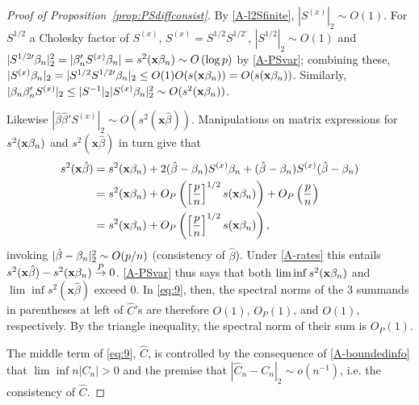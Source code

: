 \documentclass{article}
\theoremstyle{remark}
\begin{document}
\begin{proof}[Proof of Proposition~\ref{prop:PSdiffconsist}]
By \ref{A-l2Sfinite}, $|S^{(x)}|_{2} \sim O(1)$.  For $S^{1/2}$ a Cholesky factor of $S^{(x)}$, $S^{(x)} = S^{1/2}S^{1/2\prime}$, $|S^{1/2}|_{2} \sim O(1)$ and $|S^{{1/2}\prime}\beta_{n } |_{2}^{2} = |\beta_{n }'S^{(x)}\beta_{n }| = s^{2}(\mathbf{x}\beta_{n }) \sim O\left( \log p\right)
$ by \ref{A-PSvar}; combining these, $|S^{(x)}\betatrue|_{2} = |S^{1/2}S^{{1/2}\prime}\betatrue|_{2} \leq O(1) O(s(\mathbf{x}\betatrue)) = O(s(\mathbf{x}\betatrue))  %
$.  Similarly, $|\beta_{n }\beta_{n }'S^{(x)}|_{2}  \leq |S^{-1}|_{2} |S^{(x)}\beta_{n }|_{2}^{2} \sim O(s^{2}(\mathbf{x}\beta_{n }))$. 

Likewise $|\hat{\beta}\hat{\beta}'S^{(x)}|_{2} \sim O(s^{2}(\mathbf{x}\hat\beta))$.  Manipulations on matrix expressions for $s^2(\mathbf{x}\beta_{n })$ and $s^2(\mathbf{x}\hat\beta)$ in turn give that 
\begin{align}
  s^{2}(\mathbf{x}\hat\beta) &= s^{2}(\mathbf{x}\beta_{n }) + 2(\hat\beta - \beta_{n })S^{(x)}\beta_{n } + (\hat\beta - \beta_{n })S^{(x)}(\hat\beta -\beta_{n }) \nonumber \\
  &= s^{2}(\mathbf{x}\beta_{n }) + O_{P}\left(\left[\frac{p }{n}\right]^{1/2}s(\mathbf{x}\beta_{n })\right) + O_{P}\left(  \frac{p}{n} \right) \nonumber \\
& = s^{2}(\mathbf{x}\beta_{n }) + O_{P}\left(\left[\frac{p}{n}\right]^{1/2}s(\mathbf{x}\beta_{n })\right)  ,\label{eq:11}
\end{align}
invoking  $|\hat\beta - \beta_{n }|_{2}^{2} \sim O(p/n)$ (consistency of $\hat\beta$).
Under \ref{A-rates} this entails $ s^{2}(\mathbf{x}\hat\beta) -  s^{2}(\mathbf{x}\beta_{n }) \stackrel{P}{\rightarrow} 0$.  \ref{A-PSvar} thus says that both  $\lim\inf s^{2}(\mathbf{x}\beta_{n })$ and $\lim\inf s^{2}(\mathbf{x}\hat\beta)$ exceed 0. 
In \eqref{eq:9}, then, the spectral norms of the 3 summands in parentheses at left of $\hat{C}$'s are therefore $O(1)$, $O_{P}(1)$, and $O(1)$, respectively. By the triangle inequality, the spectral norm of their sum is $O_{P}(1)$.

The middle term of \eqref{eq:9}, $\hat C$, is controlled by the consequence of \ref{A-boundedinfo} that $\lim\inf n|C_{n}|>0$ and the premise that $|\hat{C}_{n} - C_{n}|_{2} \sim o(n^{-1})$, i.e. the consistency of $\hat{C}$.  


\end{proof}
\end{document}
